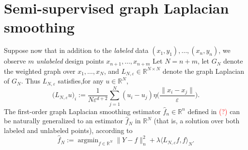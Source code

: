 \documentclass{article}
\newcommand{\Reals}{\mathbb{R}}
\newcommand{\1}{\mathbf{1}}
\DeclareMathOperator*{\argmin}{argmin}
\newcommand{\dotp}[2]{\langle #1, #2 \rangle}
\newcommand{\wh}[1]{\widehat{#1}}
\theoremstyle{alden}
\theoremstyle{aldenthm}
\theoremstyle{definition}
\theoremstyle{remark}
\begin{document}
\section{Semi-supervised graph Laplacian smoothing}

Suppose now that in addition to the \emph{labeled} data $(x_1,y_1),\ldots,(x_n,y_n)$, we observe $m$ \emph{unlabeled} design points $x_{n + 1},\ldots,x_{n + m}$ Let $N = n + m$, let $G_{N}$ denote the weighted graph over $x_1,\ldots,x_N$, and $L_{N,\varepsilon} \in \Reals^{N \times N}$ denote the graph Laplacian of $G_{N}$. Thus $L_{N,\varepsilon}$ satisfies,for any $u \in \Reals^N$,
\begin{equation}
\label{eqn:graph_laplacian_all}
\bigl(L_{N,\varepsilon}u\bigr)_i := \frac{1}{N \varepsilon^{d + 2}}\sum_{j = 1}^{N} (u_i - u_j) \eta\biggl(\frac{\|x_i - x_j\|}{\varepsilon}\biggr).
\end{equation}
The first-order graph Laplacian smoothing estimator $\wh{f}_n \in \Reals^n$ defined in \textcolor{red}{(?)} can be naturally generalized to an estimator $\wh{f}_N$ in $\Reals^N$ (that is, a solution over both labeled and unlabeled points), according to
\begin{equation}
\label{eqn:ssl_graph_laplacian_smoothing_0}
\wh{f}_N := \argmin_{f \in \Reals^N} \|Y - f\|_n^2 + \lambda \dotp{L_{N,\varepsilon}f}{f}_N.
\end{equation}
\end{document}

